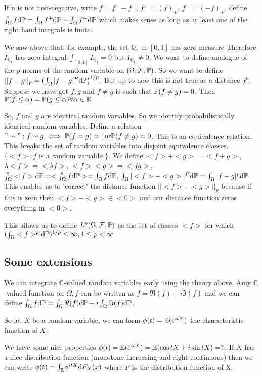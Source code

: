 If n is not non-negative, write $f=f^+-f^-$, $f^+=(f)_+$, $f^-=(-f)_+$, define $\int_\Omega f\text{d}\mathbb{P}=\int_\Omega f^+\text{d}\mathbb{P}-\int_\Omega f^-\text{d}\mathbb{P}$ which makes sense as long as at least one of the right hand integrals is finite.

We saw above that, for example, the set $\mathbb{Q}_1$ in $[0,1]$ has zero measure Therefore $I_{\mathbb{Q}_1}$ has zero integral $\int_{[0,1]}I_{\mathbb{Q}_1}=0$ but $I_{\mathbb{Q}_1}\neq 0$. We want to define analogue of the p-norms of the random variable on $(\Omega,\mathcal{F},\mathbb{P})$. So we want to define $||f-g||_p=\left( \int_\Omega |f-g|^P\text{d}\mathbb{P} \right)^{1/p}$. But up to now this is not true as a distance $f^n$. Suppose we have got $f,g$ and ${f\neq g}$ is such that $\mathbb{P}(f\neq g)=0$. Then $\mathbb{P}(f\leq \alpha)=\mathbb{P}(g\leq\alpha)\forall\alpha\in\mathbb{R}$

So, $f$ and $g$ are identical random variables. So we identify probabilistically identical random variables. Define a relation $"\sim": f\sim g\iff\mathbb{P}(f=g)=1\text{or}\mathbb{P}(f\neq g)=0$. This is an equivalence relation. This breaks the set of random variables into disjoint equivalence classes. $\{ <f>:f\text{ is a random variable } \}$. We define $<f>+<g>=<f+g>$, $\lambda<f>=<\lambda f>$, $<f><g>=<fg>$, $\int_\Omega<f>\text{d}\mathbb{P}=<\int_\Omega f \text{d}\mathbb{P}>=\int_\Omega f \text{d}\mathbb{P}$, $\int_\Omega |<f>-<g>|^P\text{d}\mathbb{P}=\int_\Omega |f-g|^p\text{d}\mathbb{P}$. This enables us to 'correct' the distance function $||<f>-<g>||_p$ because if this is zero then $<f>-<g>\in<0>$ and our distance function zeros everything in $<0>$.

This allows us to define $L^p(\Omega,\mathcal{F},\mathbb{P})$ as the set of classes $<f>$ for which $(\int_\Omega <f>^p\text{d}\mathbb{P})^{1/p}\leq\infty, 1\leq p <\infty$

\subsection{Some extensions}

We can integrate $\mathbb{C}$-valued random variables early using the theory above. Amy $\mathbb{C}$-valued function on $\Omega, f$ can be written as $f=\Re(f)+i\Im(f)$ and we can define $\int_\Omega f\text{d}\mathbb{P}=\int_\Omega\Re(f)\text{d}\mathbb{P}+i\int_\Omega\Im(f)\text{d}\mathbb{P}$.

So let $X$ be a random variable, we can form $\phi(t)=\mathbb{E}(\text{e}^{itX})$ the characteristic function of $X$.

We have some nice properties $\phi(t)=\mathbb{E}(\text{e}^{itX})=\mathbb{E}(\cos tX+i\sin tX)=?$. If $X$ has a nice distribution function (monotone increasing and right continuous) then we can write $\phi(t)=\int_\mathbb{R}\text{e}^{itX}\text{d}F_X(x)$ where $F$ is the distribution function of X.

